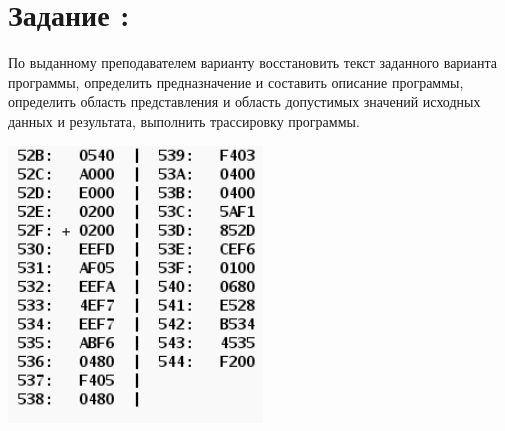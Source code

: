 \thispagestyle{empty}
\section{\textbf{\Large{Задание :}}}
По выданному преподавателем варианту восстановить текст заданного варианта программы, определить предназначение и составить описание программы, определить область представления и область допустимых значений исходных данных и результата, выполнить трассировку программы.
\begin{center}
\includegraphics{img/Task.PNG}
\end{center}
